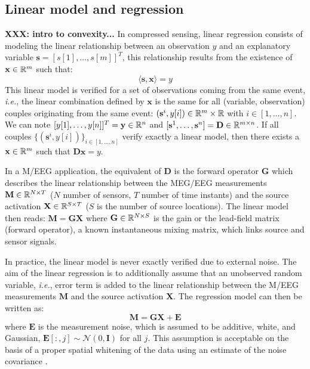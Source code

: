 \subsection{Linear model and regression}
\textbf{XXX: intro to convexity...}
In compressed sensing, linear regression consists of modeling the linear relationship between an observation $y$ and an explanatory variable $\mathbf{s}=[s[1],\dots ,s[m]]^T$, this relationship results from the existence of $\mathbf{x}\in\mathbb{R}^m$ such that:
\begin{equation} \label{eq_linreg}
	\langle\mathbf{s}, \mathbf{x}\rangle = y
\end{equation}
This linear model is verified for a set of observations coming from the same event, \textit{i.e.}, the linear combination defined by $\mathbf{x}$ is the same for all (variable, observation) couples originating from the same event: $(\mathbf{s}^i, y[i])\in\mathbb{R}^m\times\mathbb{R}$ with $i\in [1,\dots ,n]$. We can note $[y[1], \dots ,y[n]]^T=\mathbf{y}\in\mathbb{R}^n$ and $[\mathbf{s}^1,\dots ,\mathbf{s}^n]=\mathbf{D}\in\mathbb{R}^{m\times n}$. If all couples $\{(\mathbf{s}^i,y[i])\}_{i\in [1,\dots ,n]}$ verify exactly a linear model, then there exists a $\mathbf{x}\in\mathbb{R}^m$ such that $\mathbf{Dx}=y$.

In a M/EEG application, the equivalent of $\mathbf{D}$ is the forward operator $\mathbf{G}$ which describes the linear relationship between the MEG/EEG measurements $\mathbf{M}\in\mathbb{R}^{N\times T}$ ($N$ number of sensors, $T$ number of time instants) and the source activation $\mathbf{X}\in\mathbb{R}^{S\times T}$ ($S$ is the number of source locations). The linear model then reads: $\mathbf{M} = \mathbf{GX}$ where $\mathbf{G}\in\mathbb{R}^{N\times S}$ is the gain or the lead-field matrix (forward operator), a known instantaneous mixing matrix, which links source and sensor signals. 

In practice, the linear model is never exactly verified due to external noise. The aim of the linear regression is to additionally assume that an unobserved random variable, \textit{i.e.}, error term is added to the linear relationship between the M/EEG measurements $\mathbf{M}$ and the source activation $\mathbf{X}$. The regression model can then be written as:
\begin{equation} \label{eq_linmeeg}
	\mathbf{M} = \mathbf{GX} + \mathbf{E}
\end{equation}
where $\mathbf{E}$ is the measurement noise, which is assumed to be additive, white, and Gaussian, \mbox{$\mathbf{E}[:,j]\sim\mathcal{N}(0,\mathbf{I})$} for all $j$. This assumption is acceptable on the basis of a proper spatial whitening of the data using an estimate of the noise covariance \cite{engemann2015automated}.

